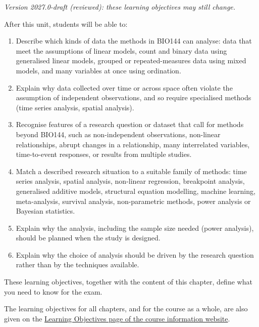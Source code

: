 \documentclass[
  letterpaper,
  8pt,
  a4paper]{book}
\providecommand{\tightlist}{%
  \setlength{\itemsep}{0pt}\setlength{\parskip}{0pt}}
\begin{document}
\begin{tcolorbox}[enhanced jigsaw, arc=.35mm, bottomrule=.15mm, bottomtitle=1mm, breakable, colback=white, colbacktitle=quarto-callout-note-color!10!white, colframe=quarto-callout-note-color-frame, coltitle=black, left=2mm, leftrule=.75mm, opacityback=0, opacitybacktitle=0.6, rightrule=.15mm, title=\textcolor{quarto-callout-note-color}{\faInfo}\hspace{0.5em}{Learning objectives}, titlerule=0mm, toprule=.15mm, toptitle=1mm]

\emph{Version 2027.0-draft (reviewed): these learning objectives may
still change.}

After this unit, students will be able to:

\begin{enumerate}
\def\labelenumi{\arabic{enumi}.}
\tightlist
\item
  Describe which kinds of data the methods in BIO144 can analyse: data
  that meet the assumptions of linear models, count and binary data
  using generalised linear models, grouped or repeated-measures data
  using mixed models, and many variables at once using ordination.
\item
  Explain why data collected over time or across space often violate the
  assumption of independent observations, and so require specialised
  methods (time series analysis, spatial analysis).
\item
  Recognise features of a research question or dataset that call for
  methods beyond BIO144, such as non-independent observations,
  non-linear relationships, abrupt changes in a relationship, many
  interrelated variables, time-to-event responses, or results from
  multiple studies.
\item
  Match a described research situation to a suitable family of methods:
  time series analysis, spatial analysis, non-linear regression,
  breakpoint analysis, generalised additive models, structural equation
  modelling, machine learning, meta-analysis, survival analysis,
  non-parametric methods, power analysis or Bayesian statistics.
\item
  Explain why the analysis, including the sample size needed (power
  analysis), should be planned when the study is designed.
\item
  Explain why the choice of analysis should be driven by the research
  question rather than by the techniques available.
\end{enumerate}

These learning objectives, together with the content of this chapter,
define what you need to know for the exam.

The learning objectives for all chapters, and for the course as a whole,
are also given on the
\href{https://opetchey.github.io/BIO144_Course_Information/3.1-learning-objectives.html}{Learning
Objectives page of the course information website}.

\end{tcolorbox}
\end{document}
